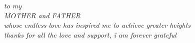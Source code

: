 \documentclass[12pt]{report}
\begin{document}

\begin{CenteredPage}
{\it to my\\[0.2in]
MOTHER and FATHER\\[0.2in]
whose endless love has inspired me to achieve greater heights \\ [0.2in]
thanks for all the love and support, i am forever grateful}
\end{CenteredPage}



\tableofcontents        %

\listoftables

\listoffigures



\StartBody





     
%
         

%



\end{document}
